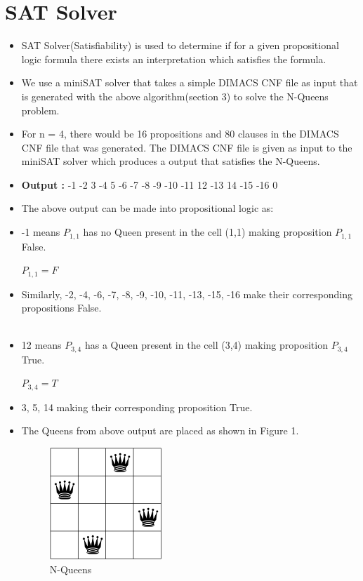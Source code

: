 \documentclass{article}
\begin{document}
\section{SAT Solver}
    \begin{itemize}
    \item SAT Solver(Satisfiability) is used to determine if for a given propositional logic formula there exists an interpretation which satisfies the formula.
    \item We use a miniSAT solver that takes a simple DIMACS CNF file as input that is generated with the above algorithm(section 3) to solve the N-Queens problem.
    \item For n = 4, there would be 16 propositions and 80 clauses in the DIMACS CNF file that was generated. The DIMACS CNF file is given as input to the miniSAT solver which produces a output that satisfies the N-Queens.
    \item \textbf{Output : } -1 -2 3 -4 5 -6 -7 -8 -9 -10 -11 12 -13 14 -15 -16 0
    \item The above output can be made into propositional logic as:
    \item -1 means $P_{1,1}$ has no Queen present in the cell (1,1) making proposition $P_{1,1}$ False.
    \begin{center}
        $P_{1,1} = F$
    \end{center}
    \item Similarly, -2, -4, -6, -7, -8, -9, -10, -11, -13, -15, -16 make their corresponding propositions False.
    \\
    \\
     \item 12 means $P_{3,4}$ has a Queen present in the cell (3,4) making proposition $P_{3,4}$ True.
    \begin{center}
        $P_{3,4} = T$
    \end{center}
    \item 3, 5, 14 making their corresponding proposition True.
    \item The Queens from above output are placed as shown in Figure 1.
        \begin{figure}[h]
            \centering
            \includegraphics{4-queens.png}
            \caption{N-Queens}
            \label{fig:my_label}
        \end{figure}
    \end{itemize}
   
       
\end{document}
